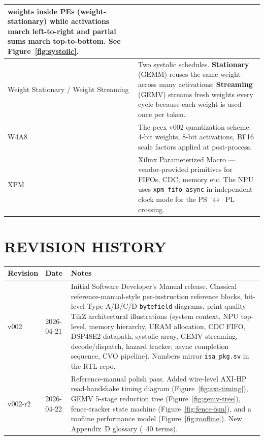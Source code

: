 \documentclass[11pt,a4paper,twoside,openany]{report}
\begin{document}
\begin{longtable}{|>{\raggedright\arraybackslash}p{3.8cm}|p{11.8cm}|}
weights inside PEs (weight-stationary) while activations march
left-to-right and partial sums march top-to-bottom.  See
Figure~\ref{fig:systolic}. \\
\hline
Weight Stationary / Weight Streaming & Two systolic schedules.
\textbf{Stationary} (GEMM) reuses the same weight across many
activations; \textbf{Streaming} (GEMV) streams fresh weights every
cycle because each weight is used once per token. \\
\hline
W4A8 & The pccx v002 quantization scheme: 4-bit weights, 8-bit
activations, BF16 scale factors applied at post-process. \\
\hline
XPM & Xilinx Parameterized Macro --- vendor-provided primitives for
FIFOs, CDC, memory etc.  The NPU uses \texttt{xpm\_fifo\_async} in
independent-clock mode for the PS~$\leftrightarrow$~PL crossing. \\
\hline
\end{longtable}

\newpage

\chapter{REVISION HISTORY}

\begin{longtable}{|l|l|p{9.5cm}|}
\hline
\rowcolor{skytint}
\textbf{Revision} & \textbf{Date} & \textbf{Notes} \\
\hline
\endfirsthead
v002 & 2026-04-21 &
Initial Software Developer's Manual release.  Classical
reference-manual-style per-instruction reference blocks, bit-level
Type A/B/C/D \texttt{bytefield} diagrams, print-quality TikZ architectural
illustrations (system context, NPU top-level, memory hierarchy,
URAM allocation, CDC FIFO, DSP48E2 datapath, systolic array, GEMV
streaming, decode/dispatch, hazard tracker, async completion
sequence, CVO pipeline).  Numbers mirror \texttt{isa\_pkg.sv} in
the RTL repo. \\
\hline
v002-r2 & 2026-04-22 &
Reference-manual polish pass.  Added wire-level AXI-HP read-handshake
timing diagram (Figure~\ref{fig:axi-timing}), GEMV 5-stage
reduction tree (Figure~\ref{fig:gemv-tree}), fence-tracker state
machine (Figure~\ref{fig:fence-fsm}), and a roofline performance
model (Figure~\ref{fig:roofline}).  New Appendix~D glossary
(~40 terms). \\
\hline
\end{longtable}
\end{document}
